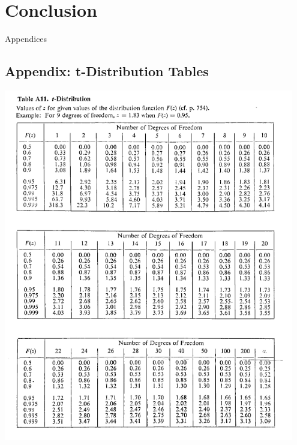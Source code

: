 \documentclass{article}
\begin{document}
\section{Conclusion}

\newpage
\thispagestyle{empty}  %
\begin{center}
	\vspace*{\fill}
	{\Huge Appendices}
	\vspace*{\fill}
\end{center}

\newpage
\begin{appendices}
\pagestyle{fancy}
\renewcommand{\thefigure}{A\arabic{figure}}
\setcounter{figure}{0}

\section*{Appendix: t-Distribution Tables}
\hypertarget{1}{\includegraphics[width=0.95\textwidth]{t_distribution_Table_lecture3.png}}
\end{appendices}
\end{document}
